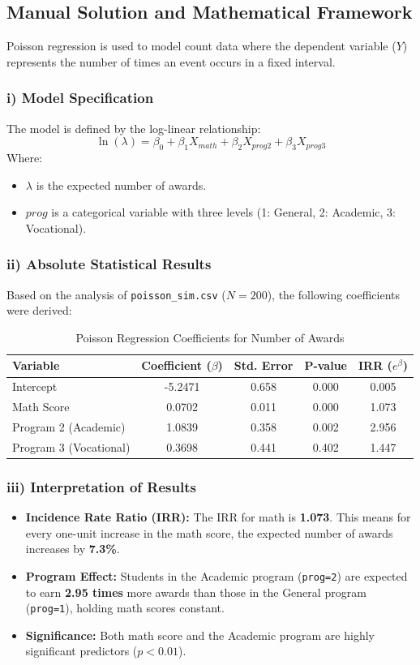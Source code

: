 \documentclass[12pt, a4paper]{article}
\begin{document}
\subsection{Manual Solution and Mathematical Framework}
Poisson regression is used to model count data where the dependent variable ($Y$) represents the number of times an event occurs in a fixed interval.

\subsubsection{i) Model Specification}
The model is defined by the log-linear relationship:
\[ \ln(\lambda) = \beta_0 + \beta_1 X_{math} + \beta_2 X_{prog2} + \beta_3 X_{prog3} \]
Where:
\begin{itemize}
    \item $\lambda$ is the expected number of awards.
    \item $prog$ is a categorical variable with three levels (1: General, 2: Academic, 3: Vocational).
\end{itemize}

\subsubsection{ii) Absolute Statistical Results}
Based on the analysis of \texttt{poisson\_sim.csv} ($N=200$), the following coefficients were derived:

\begin{table}[h!]
\centering
\caption{Poisson Regression Coefficients for Number of Awards}
\begin{tabular}{@{}lcccc@{}}
\toprule
Variable & Coefficient ($\beta$) & Std. Error & P-value & IRR ($e^\beta$) \\ \midrule
Intercept & -5.2471 & 0.658 & 0.000 & 0.005 \\
Math Score & 0.0702 & 0.011 & 0.000 & 1.073 \\
Program 2 (Academic) & 1.0839 & 0.358 & 0.002 & 2.956 \\
Program 3 (Vocational) & 0.3698 & 0.441 & 0.402 & 1.447 \\ \bottomrule
\end{tabular}
\end{table}

\subsubsection{iii) Interpretation of Results}
\begin{itemize}
    \item \textbf{Incidence Rate Ratio (IRR):} The IRR for math is \textbf{1.073}. This means for every one-unit increase in the math score, the expected number of awards increases by \textbf{7.3\%}.
    \item \textbf{Program Effect:} Students in the Academic program (\texttt{prog=2}) are expected to earn \textbf{2.95 times} more awards than those in the General program (\texttt{prog=1}), holding math scores constant.
    \item \textbf{Significance:} Both math score and the Academic program are highly significant predictors ($p < 0.01$).
\end{itemize}
\end{document}
